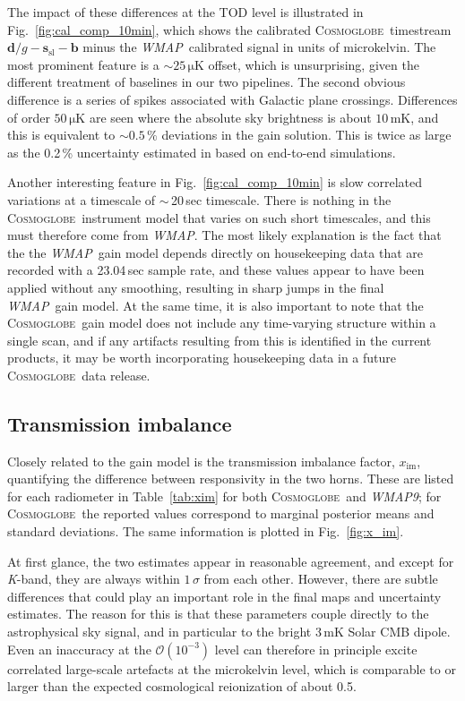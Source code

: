 \documentclass[twocolumn]{../../common/aa}
\def\WMAP{\emph{WMAP}}
\def\WMAPnine{\emph{WMAP9}}
\newcommand{\cosmoglobe}{\textsc{Cosmoglobe}}
\newcommand{\K}[0]{\textit K}
\begin{document}
The impact of these differences at the TOD level is illustrated in Fig.~\ref{fig:cal_comp_10min}, which shows the calibrated \cosmoglobe\ timestream $\boldsymbol d/g-\boldsymbol s_\mathrm{sl}-\boldsymbol b$ minus the \WMAP\ calibrated signal in units of microkelvin. The most prominent feature is a $\sim25\,\mathrm{\mu K}$ offset, which is unsurprising, given the different treatment of baselines in our two pipelines. The second obvious difference is a series of spikes associated with Galactic plane crossings. Differences of order $50\,\mathrm{\mu K}$ are seen where the absolute sky brightness is about $10\,\mathrm{mK}$, and this is equivalent to $\sim0.5\,\%$ deviations in the gain solution. This is twice as large as the 0.2\,\% uncertainty estimated in \citet{bennett2012} based on end-to-end simulations.

Another interesting feature in Fig.~\ref{fig:cal_comp_10min} is slow correlated variations at a timescale of $\sim$\,20\,sec timescale. There is nothing in the \cosmoglobe\ instrument model that varies on such short timescales, and this must therefore come from \WMAP. The most likely explanation is the fact that the the \WMAP\ gain model depends directly on housekeeping data that are recorded with a 23.04\,sec sample rate, and these values appear to have been applied without any smoothing, resulting in sharp jumps in the final \WMAP\ gain model. At the same time, it is also important to note that the \cosmoglobe\ gain model does not include any time-varying structure within a single scan, and if any artifacts resulting from this is identified in the current products, it may be worth incorporating housekeeping data in a future  \cosmoglobe\ data release.




\subsection{Transmission imbalance}
\label{sec:xim}

Closely related to the gain model is the transmission imbalance factor, $x_{\mathrm{im}}$, quantifying the difference between responsivity in the two horns. These are listed for each radiometer in Table~\ref{tab:xim} for both \cosmoglobe\ and \WMAPnine; for \cosmoglobe\ the reported values correspond to marginal posterior means and standard deviations. The same information is plotted in Fig.~\ref{fig:x_im}.

At first glance, the two estimates appear in reasonable agreement, and except for \K-band, they are always within $1\,\sigma$ from each other. However, there are subtle differences that could play an important role in the final maps and uncertainty estimates. The reason for this is that these parameters couple directly to the astrophysical sky signal, and in particular to the bright 3\,mK Solar CMB dipole. Even an inaccuracy at the $\mathcal{O}(10^{-3})$ level can therefore in principle excite correlated large-scale artefacts at the microkelvin level, which is comparable to or larger than the expected cosmological reionization of about 0.5\muK.
\end{document}
